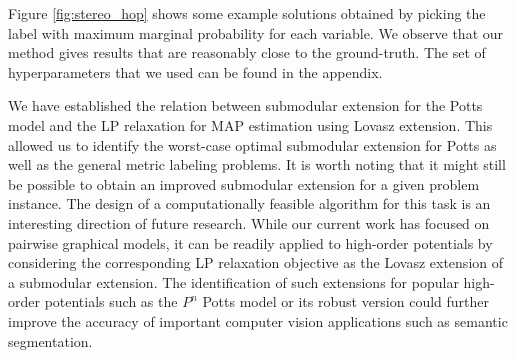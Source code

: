  Figure \ref{fig:stereo_hop} shows some example solutions
obtained by picking the label with maximum marginal probability for each
variable. We observe that our method gives results that are reasonably close to
the ground-truth. The set of hyperparameters that we used can be found in the
appendix.

\label{sec:conclude}
We have established the relation between submodular extension for the Potts
model and the LP relaxation for MAP estimation using Lovasz extension. This allowed us to identify the worst-case optimal submodular extension for Potts as well as the general metric labeling problems. It is worth noting that it might still be possible to obtain an improved submodular extension for a given problem instance. The design of a computationally feasible algorithm for this task is an interesting direction of future research. While our current work has focused on pairwise graphical models, it can be readily applied to high-order potentials by considering the corresponding LP relaxation objective as the Lovasz extension of a submodular extension. The identification of such extensions for popular high-order potentials such as the $P^n$ Potts model or its robust version could further improve the accuracy of important computer vision applications such as semantic segmentation.

\newpage

